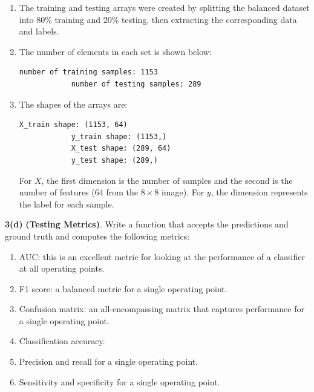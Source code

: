\documentclass[11pt]{article}
\begin{document}
	\begin{enumerate}[label=\roman*.]
		
		\item The training and testing arrays were created by splitting the balanced dataset into 80\% training and 20\% testing, then extracting the corresponding data and labels.
		
		\item The number of elements in each set is shown below:
		\begin{lstlisting}[style=matlabstyle]
			number of training samples: 1153
			number of testing samples: 289
		\end{lstlisting}
		
		\item The shapes of the arrays are:
		\begin{lstlisting}[style=matlabstyle]
			X_train shape: (1153, 64)
			y_train shape: (1153,)
			X_test shape: (289, 64)
			y_test shape: (289,)
		\end{lstlisting}
		
		For $X$, the first dimension is the number of samples and the second is the number of features (64 from the $8 \times 8$ image).  
		For $y$, the dimension represents the label for each sample.
		
	\end{enumerate}
	
	\textbf{3(d)} \textbf{(Testing Metrics)}. Write a function that accepts the predictions and ground truth and computes the following
	metrics:
	
	\begin{enumerate}[label=\roman*.]
		\item AUC: this is an excellent metric for looking at the performance of a classifier at all operating points.
		
		\item F1 score: a balanced metric for a single operating point.
		
		\item Confusion matrix: an all-encompassing matrix that captures performance for a single operating point.
		
		\item Classification accuracy.
		
		\item Precision and recall for a single operating point.
		
		\item Sensitivity and specificity for a single operating point.
	\end{enumerate}
	
\end{document}
